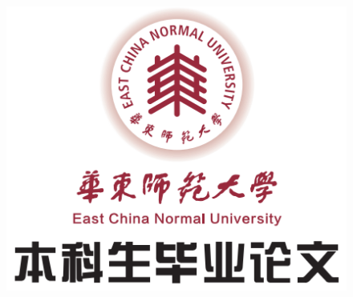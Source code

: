 
\thispagestyle{empty}
\begin{titlepage}
	
	\setul{1pt}{1.2pt} 
	\begin{center}\noindent \bf {}\end{center}
	
	\begin{figure}[H]
		\centering
		\includegraphics{./figures/logo.png}
	\end{figure}
			    
	\begin{spacing}{3}
		\begin{center}
			\noindent 
			\textbf{}
			\\
			\textbf{}
		\end{center}
	\end{spacing}
			    

\end{titlepage}
